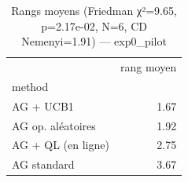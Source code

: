 \begin{table}
\caption{Rangs moyens (Friedman χ²=9.65, p=2.17e-02, N=6, CD Nemenyi=1.91) — exp0_pilot}
\label{tab:friedman_rangs}
\begin{tabular}{lr}
\toprule
 & rang moyen \\
method &  \\
\midrule
AG + UCB1 & 1.67 \\
AG op. aléatoires & 1.92 \\
AG + QL (en ligne) & 2.75 \\
AG standard & 3.67 \\
\bottomrule
\end{tabular}
\end{table}
